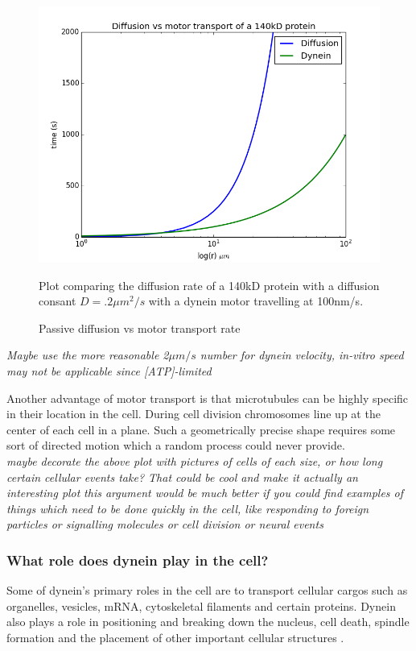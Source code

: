 \documentclass[10pt]{article} %
\begin{document}
\begin{figure}[h]
  \centering
  \includegraphics[width=.65\textwidth,keepaspectratio]{../../figures/diffusion_vs_dynein.png}
  \caption{Passive diffusion vs motor transport rate}{Plot comparing the diffusion rate of a 140kD protein with a diffusion consant $D = .2 \mu m^2/s$ with a dynein motor travelling at 100nm/s.}
  \label{fig:diffusion_vs_dynein}
\end{figure}

\textit{Maybe use the more reasonable 2$\mu m / s$ number for dynein velocity, in-vitro speed may not be applicable since [ATP]-limited}

Another advantage of motor transport is that microtubules can be highly specific in their location in the cell. During cell division chromosomes line up at the center of each cell in a plane. Such a geometrically precise shape requires some sort of directed motion which a random process could never provide.\\

\textit{maybe decorate the above plot with pictures of cells of each size, or how long certain cellular events take? That could be cool and make it actually an interesting plot}
\textit{this argument would be much better if you could find examples of things which need to be done quickly in the cell, like responding to foreign particles or signalling molecules or cell division or neural events}

\subsubsection{What role does dynein play in the cell?}
Some of dynein's primary roles in the cell are to transport cellular cargos such as organelles, vesicles, mRNA, cytoskeletal filaments and certain proteins. Dynein also plays a role in positioning and breaking down the nucleus, cell death, spindle formation and the placement of other important cellular structures \cite{valetoolbox}.\\
\end{document}
